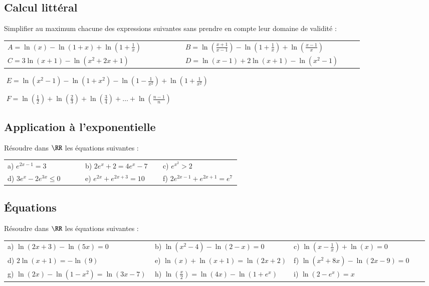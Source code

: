 \documentclass[oneside,12pt]{article}          %
\begin{document}
\subsection{Calcul littéral}
Simplifier au maximum chacune des expressions suivantes sans prendre en compte leur domaine de validité :

\begin{tabular}{p{0.45\linewidth}p{0.45\linewidth}}
	$A=\ln(x)-\ln(1+x)+\ln(1+\frac{1}{x})$ & $B=\ln\left(\frac{x+1}{x-1}\right)-\ln\left(1+\frac{1}{x}\right)+\ln\left(\frac{x-1}{x}\right)$ \\
	$C=3\ln(x+1)-\ln\left(x^2+2x+1\right)$ & $D=\ln(x-1)+2\ln(x+1)-\ln(x^2-1)$
\end{tabular}

\,\,$E=\ln(x^2-1)-\ln(1+x^2)-\ln\left(1-\frac{1}{x^2}\right)+\ln\left(1+\frac{1}{x^2}\right)$

\,\,$F=\ln\left(\frac{1}{2}\right)+\ln\left(\frac{2}{3} \right)+\ln\left(\frac{3}{4}\right)+\ldots+\ln\left( \frac{n-1}{n}\right)$



\subsection{Application à l'exponentielle}
Résoudre dans $\RR$ les équations suivantes :

\renewcommand{\arraystretch}{1.8}
\begin{tabular}{p{0.33\linewidth} p{0.33\linewidth} p{0.33\linewidth}}
a) $e^{2x-1} = 3$ & b) $2e^x + 2 = 4e^x-7$ & c) $e^{x^2} > 2$ \\
d) $3e^x - 2e^{3x} \leq 0$ & e) $e^{2x} + e^{2x+3} = 10$ & f) $2e^{2x-1} + e^{2x+1} = e^7$ \\
\end{tabular}



\subsection{Équations}
Résoudre dans $\RR$ les équations suivantes :

\renewcommand{\arraystretch}{1.8}
\begin{tabular}{p{0.35\linewidth} p{0.33\linewidth} p{0.32\linewidth}}
a) $\ln\left(2x+3\right) - \ln\left(5x\right) = 0$ & b) $\ln\left(x^2-4\right) - \ln\left(2-x\right) = 0$ & c) $\ln\left(x-\frac{1}{x}\right) + \ln\left(x\right) = 0$ \\
d) $2\ln\left(x+1\right) = -\ln(9)$ & e) $\ln\left(x\right) + \ln\left(x+1\right) = \ln\left(2x+2\right)$ &
f) $\ln\left(x^2 + 8x\right) - \ln\left(2x-9\right) = 0$ \\
g) $\ln\left(2x\right) - \ln\left(1-x^2\right) = \ln\left(3x-7\right)$ & h) $\ln\left(\frac{x}{2}\right) = \ln\left(4x\right) - \ln\left(1+e^x\right)$ & i) $\ln\left(2-e^x\right) = x$ \\
\end{tabular}
\end{document}
